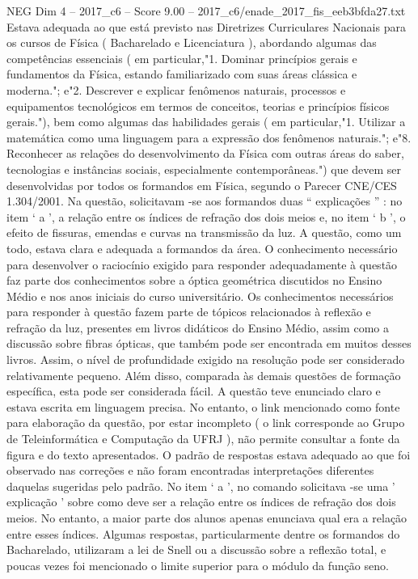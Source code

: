 \begin{textsample}{NEG Dim 4 – 2017\_c6 – Score 9.00 – 2017\_c6/enade\_2017\_fis\_eeb3bfda27.txt}
Estava adequada ao que está previsto nas Diretrizes Curriculares Nacionais para os cursos de Física ( Bacharelado e Licenciatura ), abordando algumas das competências essenciais ( em particular,"1.
Dominar princípios gerais e fundamentos da Física, estando familiarizado com suas áreas clássica e moderna."; e"2.
Descrever e explicar fenômenos naturais, processos e equipamentos tecnológicos em termos de conceitos, teorias e princípios físicos gerais."), bem como algumas das habilidades gerais ( em particular,"1.
Utilizar a matemática como uma linguagem para a expressão dos fenômenos naturais."; e"8.
Reconhecer as relações do desenvolvimento da Física com outras áreas do saber, tecnologias e instâncias sociais, especialmente contemporâneas.") que devem ser desenvolvidas por todos os formandos em Física, segundo o Parecer CNE/CES 1.304/2001.
Na questão, solicitavam -se aos formandos duas “ explicações ” : no item ‘ a ’, a relação entre os índices de refração dos dois meios e, no item ‘ b ’, o efeito de fissuras, emendas e curvas na transmissão da luz.
A questão, como um todo, estava clara e adequada a formandos da área.
O conhecimento necessário para desenvolver o raciocínio exigido para responder adequadamente à questão faz parte dos conhecimentos sobre a óptica geométrica discutidos no Ensino Médio e nos anos iniciais do curso universitário.
Os conhecimentos necessários para responder à questão fazem parte de tópicos relacionados à reflexão e refração da luz, presentes em livros didáticos do Ensino Médio, assim como a discussão sobre fibras ópticas, que também pode ser encontrada em muitos desses livros.
Assim, o nível de profundidade exigido na resolução pode ser considerado relativamente pequeno.
Além disso, comparada às demais questões de formação específica, esta pode ser considerada fácil.
A questão teve enunciado claro e estava escrita em linguagem precisa.
No entanto, o link mencionado como fonte para elaboração da questão, por estar incompleto ( o link corresponde ao Grupo de Teleinformática e Computação da UFRJ ), não permite consultar a fonte da figura e do texto apresentados.
O padrão de respostas estava adequado ao que foi observado nas correções e não foram encontradas interpretações diferentes daquelas sugeridas pelo padrão.
No item ‘ a ’, no comando solicitava -se uma ' explicação ' sobre como deve ser a relação entre os índices de refração dos dois meios.
No entanto, a maior parte dos alunos apenas enunciava qual era a relação entre esses índices.
Algumas respostas, particularmente dentre os formandos do Bacharelado, utilizaram a lei de Snell ou a discussão sobre a reflexão total, e poucas vezes foi mencionado o limite superior para o módulo da função seno.

\end{textsample}
